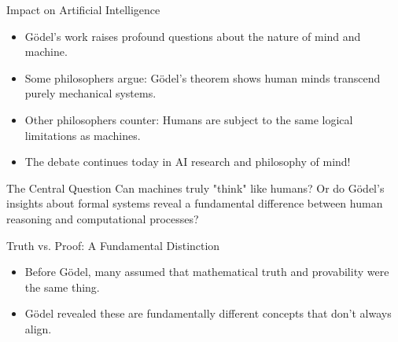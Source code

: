 \documentclass[aspectratio=169]{beamer}
\begin{document}
\begin{frame}{Impact on Artificial Intelligence}

\begin{itemize}
    \item Gödel's work raises profound questions about the nature of mind and machine.
    \item Some philosophers argue: Gödel's theorem shows human minds transcend purely mechanical systems.
    \item Other philosophers counter: Humans are subject to the same logical limitations as machines.
    \item The debate continues today in AI research and philosophy of mind!
\end{itemize}

\begin{block}{The Central Question}
Can machines truly "think" like humans? Or do Gödel's insights about formal systems reveal a fundamental difference between human reasoning and computational processes?
\end{block}

\end{frame}

\begin{frame}{Truth vs. Proof: A Fundamental Distinction}

\begin{itemize}
    \item Before Gödel, many assumed that mathematical truth and provability were the same thing.
    \item Gödel revealed these are fundamentally different concepts that don't always align.
\end{itemize}

\begin{center}
\end{center}

\end{frame}
\end{document}
